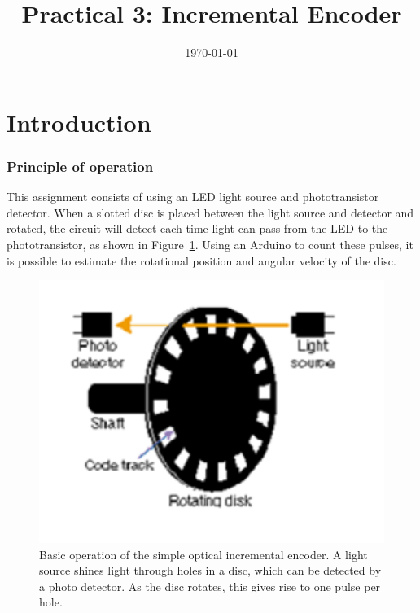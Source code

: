 \documentclass{instructions}
\title{Practical 3: Incremental Encoder}
\date{\today}
\begin{document}
\maketitle





\part{Introduction}

\section{Principle of operation}

This assignment consists of using an LED light source and phototransistor
detector.  When a slotted disc is placed between the light source and detector
and rotated, the circuit will detect each time light can pass from the LED to
the phototransistor, as shown in Figure~\ref{Principle}. Using an Arduino to
count  these  pulses, it  is  possible  to  estimate  the  rotational position
and angular velocity of the disc. 


\begin{figure}[h!]
    \centering
    \includegraphics[width=0.5\linewidth]{encoder-000}
    \caption{Basic  operation  of  the  simple  optical  incremental  encoder.  A  light 
source shines light through holes in a disc, which can be detected by a photo 
detector. As the disc rotates, this gives rise to one pulse per hole.}
    \label{Principle}
\end{figure}
\end{document}
